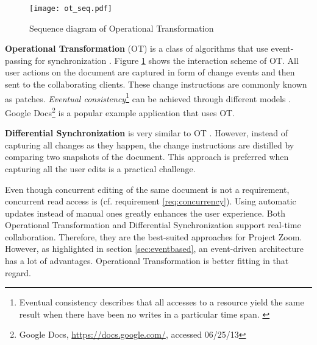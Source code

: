 \begin{figure}[!h]
\begin{center}
\texttt{[image: ot\_seq.pdf]}
\caption{Sequence diagram of Operational Transformation}

\label{fig:optr}
\end{center}
\end{figure}


\textbf{Operational Transformation} (OT) is a class of algorithms that use event-passing for synchronization \cite{Ellis_1989}. Figure \ref{fig:optr} shows the interaction scheme of OT. All user actions on the document are captured in form of change events and then sent to the collaborating clients. These change instructions are commonly known as patches. \textit{Eventual consistency}\footnote{Eventual consistency describes that all accesses to a resource yield the same result when there have been no writes in a particular time span. \cite{Gustavsson_2002}} can be achieved through different models \cite{Sun_1998} \cite{Li_2004} \cite{Li_2005}. Google Docs\footnote{Google Docs, \url{https://docs.google.com/}, accessed 06/25/13} is a popular example application that uses OT.

\textbf{Differential Synchronization} is very similar to OT \cite{Fraser_2009}. However, instead of capturing all changes as they happen, the change instructions are distilled by comparing two snapshots of the document. This approach is preferred when capturing all the user edits is a practical challenge.

Even though concurrent editing of the same document is not a requirement, concurrent read access is (cf. requirement \ref{req:concurrency}). Using automatic updates instead of manual ones greatly enhances the user experience. Both Operational Transformation and Differential Synchronization support real-time collaboration. Therefore, they are the best-suited approaches for Project Zoom. However, as highlighted in section \ref{sec:eventbased}, an event-driven architecture has a lot of advantages. Operational Transformation is better fitting in that regard.

